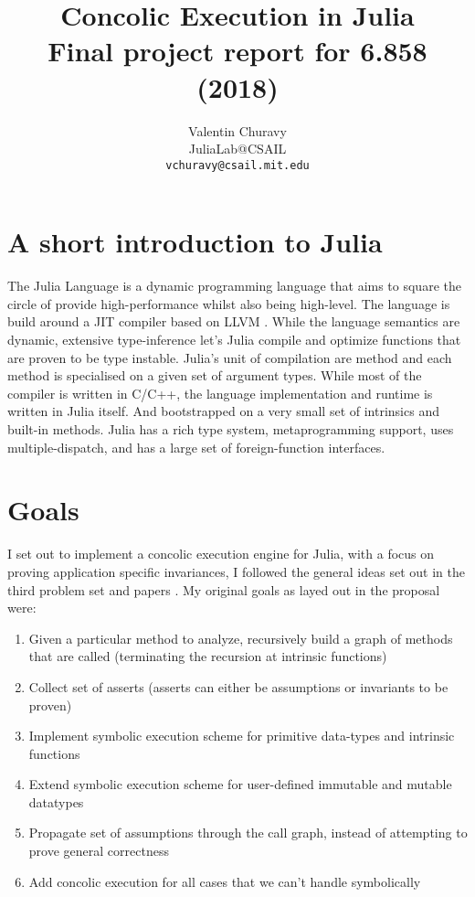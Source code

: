 \documentclass{article} %
\title{
Concolic Execution in Julia\\
\small{Final project report for 6.858 (2018)}
}
\author{
Valentin Churavy\\
JuliaLab@CSAIL\\
\texttt{vchuravy@csail.mit.edu}
}
\begin{document}
\maketitle

\section{A short introduction to Julia}
The Julia Language \cite{Bezanson2012-iw} is a dynamic programming language that aims to
square the circle of provide high-performance whilst also being high-level. The language
is build around a JIT compiler based on LLVM \cite{Lattner2004-dv}. While the language 
semantics are dynamic, extensive type-inference let's Julia compile and optimize functions 
that are proven to be type instable. Julia's unit of compilation are method and each method
is specialised on a given set of argument types. While most of the compiler is written in C/C++,
the language implementation and runtime is written in Julia itself. And bootstrapped on a very
small set of intrinsics and built-in methods. Julia has a rich type system, metaprogramming support,
uses multiple-dispatch, and has a large set of foreign-function interfaces.

\section{Goals}
I set out to implement a concolic execution engine for Julia, with a focus on proving application
specific invariances, I followed the general ideas set out in the third problem set and papers
\cite{Godefroid2005-ld, Cadar2006-hs}. My original goals as layed out in the proposal were:

\begin{enumerate}
    \item Given a particular method to analyze, recursively build a graph of methods
          that are called (terminating the recursion at intrinsic functions)
    \item Collect set of asserts (asserts can either be assumptions or invariants to be proven)
    \item Implement symbolic execution scheme for primitive data-types and intrinsic functions
    \item Extend symbolic execution scheme for user-defined immutable and mutable datatypes
    \item Propagate set of assumptions through the call graph, instead of attempting to prove general correctness
    \item Add concolic execution for all cases that we can’t handle symbolically
\end{enumerate}
\end{document}
